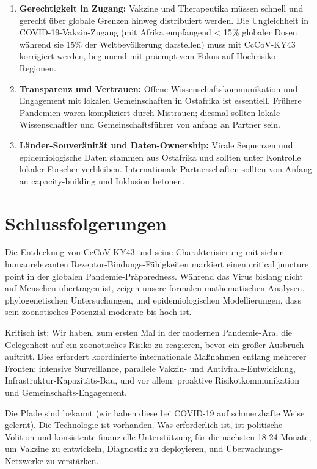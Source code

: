 \documentclass[11pt,a4paper]{article}
\theoremstyle{definition}
\begin{document}
\begin{enumerate}
\item \textbf{Gerechtigkeit in Zugang:} Vakzine und Therapeutika müssen schnell und gerecht über globale Grenzen hinweg distribuiert werden. Die Ungleichheit in COVID-19-Vakzin-Zugang (mit Afrika empfangend < 15\% globaler Dosen während sie 15\% der Weltbevölkerung darstellen) muss mit CcCoV-KY43 korrigiert werden, beginnend mit präemptivem Fokus auf Hochrisiko-Regionen.

\item \textbf{Transparenz und Vertrauen:} Offene Wissenschaftskommunikation und Engagement mit lokalen Gemeinschaften in Ostafrika ist essentiell. Frühere Pandemien waren kompliziert durch Mistrauen; diesmal sollten lokale Wissenschaftler und Gemeinschaftsführer von anfang an Partner sein.

\item \textbf{Länder-Souveränität und Daten-Ownership:} Virale Sequenzen und epidemiologische Daten stammen aus Ostafrika und sollten unter Kontrolle lokaler Forscher verbleiben. Internationale Partnerschaften sollten von Anfang an capacity-building und Inklusion betonen.
\end{enumerate}

\section{Schlussfolgerungen}

Die Entdeckung von CcCoV-KY43 und seine Charakterisierung mit sieben humanrelevanten Rezeptor-Bindungs-Fähigkeiten markiert einen critical juncture point in der globalen Pandemie-Präparedness. Während das Virus bislang nicht auf Menschen übertragen ist, zeigen unsere formalen mathematischen Analysen, phylogenetischen Untersuchungen, und epidemiologischen Modellierungen, dass sein zoonotisches Potenzial moderate bis hoch ist.

Kritisch ist: Wir haben, zum ersten Mal in der modernen Pandemie-Ära, die Gelegenheit auf ein zoonotisches Risiko zu reagieren, bevor ein großer Ausbruch auftritt. Dies erfordert koordinierte internationale Maßnahmen entlang mehrerer Fronten: intensive Surveillance, parallele Vakzin- und Antivirale-Entwicklung, Infrastruktur-Kapazitäts-Bau, und vor allem: proaktive Risikotkommunikation und Gemeinschafts-Engagement.

Die Pfade sind bekannt (wir haben diese bei COVID-19 auf schmerzhafte Weise gelernt). Die Technologie ist vorhanden. Was erforderlich ist, ist politische Volition und konsistente finanzielle Unterstützung für die nächsten 18-24 Monate, um Vakzine zu entwickeln, Diagnostik zu deployieren, und Überwachungs-Netzwerke zu verstärken.
\end{document}
